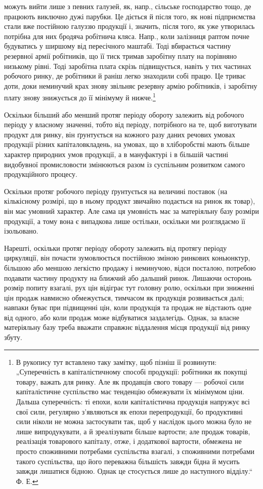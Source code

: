 можуть вийти лише з певних галузей, як, напр., сільське господарство тощо,
де працюють виключно дужі парубки. Це діється й після того, як нові підприємства
стали вже постійною галуззю продукції і, значить, після того,
як уже утворилась потрібна для них бродяча робітнича кляса. Напр.,
коли залізниця раптом почне будуватись у ширшому від пересічного
маштабі. Тоді вбирається частину резервної армії робітників, що її тиск
тримав заробітну плату на порівняно низькому рівні. Тоді заробітна плата
скрізь підвищується, навіть у тих частинах робочого ринку, де робітники
й раніш легко знаходили собі працю. Це триває доти, доки неминучий
крах знову звільняє резервну армію робітників, і заробітну плату
знову знижується до її мінімуму й нижче.\footnote{
В рукопису тут вставлено таку замітку, щоб пізніш її розвинути: „Суперечність
в капіталістичному способі продукції: робітники як покупці товару,
важать для ринку. Але як продавців свого товару — робочої сили капіталістичне
суспільство має тенденцію обмежувати їх мінімумом ціни. Дальша суперечність:
ті епохи, коли капіталістична продукція напружує всі свої сили, регулярно з’являються
як епохи перепродукції, бо продуктивні сили ніколи не можна застосувати
так, щоб у наслідок цього можна було не лише випродукувати, а й зреалізувати
більше вартости; але продаж товарів, реалізація товарового капіталу, отже,
і додаткової вартости, обмежена не просто споживними потребами суспільства
взагалі, з споживними потребами такого суспільства, що його переважна
більшість завжди бідна й мусить завжди лишатися бідною. Однак це стосується
лише до наступного відділу.“ Ф. Е.
}

Оскільки більший або менший протяг періоду обороту залежить від
робочого періоду у власному значенні, тобто від періоду, потрібного на
те, щоб виготувати продукт для ринку, він ґрунтується на кожного
разу даних речових умовах продукції різних капіталовкладень, на
умовах, що в хліборобстві мають більше характер природних умов продукції,
а в мануфактурі і в більшій частині видобувної промисловости
змінюються разом із суспільним розвитком самого продукційного процесу.

Оскільки протяг робочого періоду ґрунтується на величині поставок
(на кількісному розмірі, що в ньому продукт звичайно подається на ринок
як товар), він має умовний характер. Але сама ця умовність має за
матеріяльну базу розміри продукції, а тому вона є випадкова лише остільки,
оскільки ми розглядаємо її ізольовано.

Нарешті, оскільки протяг періоду обороту залежить від протягу періоду
циркуляції, він почасти зумовлюється постійною зміною ринкових
коньюнктур, більшою або меншою легкістю продажу і неминучою, відси
посталою, потребою подавати частину продукту на ближчий або дальший
ринок. Лишаючи осторонь розмір попиту взагалі, рух цін відіграє
тут головну ролю, оскільки при зниженні цін продаж навмисно обмежується,
тимчасом як продукція розвивається далі; навпаки буває при
підвищенні цін, коли продукція та продаж не відстають одне від одного,
або коли продаж може відбуватися заздалегідь. Однак, за власне матеріяльну
базу треба вважати справжнє віддалення місця продукції від
ринку збуту.
